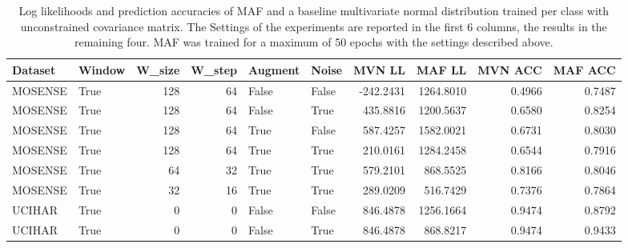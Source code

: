 \documentclass{article}
\begin{document}
\begin{landscape}
	\begin{table}
		\begin{tabularx}{18 cm}{llrrllrrrr}
			\toprule
			Dataset &  Window &  W\_size &  W\_step &  Augment &  Noise &    MVN LL &    MAF LL &  MVN ACC &  MAF ACC \\
			\midrule
			MOSENSE &    True &     128 &      64 &    False &  False & -242.2431 & 1264.8010 &   0.4966 &   0.7487 \\
			MOSENSE &    True &     128 &      64 &    False &   True &  435.8816 & 1200.5637 &   0.6580 &   0.8254 \\
			MOSENSE &    True &     128 &      64 &     True &  False &  587.4257 & 1582.0021 &   0.6731 &   0.8030 \\
			MOSENSE &    True &     128 &      64 &     True &   True &  210.0161 & 1284.2458 &   0.6544 &   0.7916 \\
			MOSENSE &    True &      64 &      32 &     True &   True &  579.2101 &  868.5525 &   0.8166 &   0.8046 \\
			MOSENSE &    True &      32 &      16 &     True &   True &  289.0209 &  516.7429 &   0.7376 &   0.7864 \\
			UCIHAR &    True &       0 &       0 &    False &  False &  846.4878 & 1256.1664 &   0.9474 &   0.8792 \\
			UCIHAR &    True &       0 &       0 &    False &   True &  846.4878 &  868.8217 &   0.9474 &   0.9433 \\
			\bottomrule
		\end{tabularx}
		\caption{\label{tab:eps50} Log likelihoods and prediction accuracies of MAF and a baseline multivariate normal distribution trained per class with unconstrained covariance matrix. The Settings of the experiments are reported in the first 6 columns, the results in the remaining four. MAF was trained for a maximum of 50 epochs with the settings described above.}
	\end{table}
\end{landscape}
\end{document}

